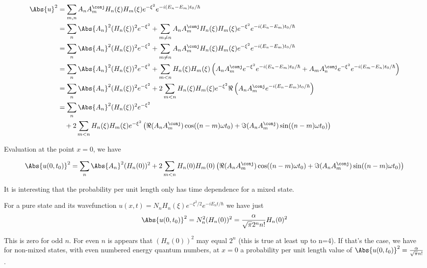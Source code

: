 \begin{align*}
\Abs{u}^2
&=
\sum_{m,n}
A_n A_m^\conj H_n(\xi) H_m(\xi) e^{-\xi^2} e^{-i (E_n - E_m)t_0/\hbar} \\
&=
\sum_n
\Abs{A_n}^2 (H_n(\xi))^2 e^{-\xi^2}
+\sum_{m \ne n}
A_n A_m^\conj H_n(\xi) H_m(\xi) e^{-\xi^2} e^{-i (E_n - E_m)t_0/\hbar} \\
&=
\sum_n
\Abs{A_n}^2 (H_n(\xi))^2 e^{-\xi^2}
+\sum_{m \ne n}
A_n A_m^\conj H_n(\xi) H_m(\xi) e^{-\xi^2} e^{-i (E_n - E_m)t_0/\hbar} \\
&=
\sum_n
\Abs{A_n}^2 (H_n(\xi))^2 e^{-\xi^2}
+\sum_{m < n}
H_n(\xi) H_m(\xi)
\left(
A_n A_m^\conj
e^{-\xi^2} e^{-i (E_n - E_m)t_0/\hbar}
+A_m A_n^\conj
e^{-\xi^2} e^{-i (E_m - E_n)t_0/\hbar}
\right) \\
&=
\sum_n
\Abs{A_n}^2 (H_n(\xi))^2 e^{-\xi^2}
+2 \sum_{m < n}
H_n(\xi) H_m(\xi)
e^{-\xi^2}
\Re \left(
A_n A_m^\conj
e^{-i (E_n - E_m)t_0/\hbar}
\right) \\
&=
\sum_n
\Abs{A_n}^2 (H_n(\xi))^2 e^{-\xi^2}  \\
&\quad+2 \sum_{m < n}
H_n(\xi) H_m(\xi)
e^{-\xi^2}
\left(
\Re ( A_n A_m^\conj ) \cos( (n - m)\omega t_0)
+\Im ( A_n A_m^\conj ) \sin( (n - m)\omega t_0)
\right) \\
\end{align*}

Evaluation at the point $x = 0$, we have

\begin{equation}\label{eqn:qmIproblemSet5:500}
\Abs{u(0,t_0)}^2
=
\sum_n
\Abs{A_n}^2 (H_n(0))^2 +2 \sum_{m < n} H_n(0) H_m(0) \left( \Re ( A_n A_m^\conj ) \cos( (n - m)\omega t_0) +\Im ( A_n A_m^\conj ) \sin( (n - m)\omega t_0)
\right)
\end{equation}

It is interesting that the probability per unit length only has time dependence for a mixed state.

For a pure state and its wavefunction $u(x,t) = N_n H_n(\xi) e^{-\xi^2/2} e^{-i E_n t/\hbar}$ we have just
\begin{equation}\label{eqn:qmIproblemSet5:510}
\Abs{u(0,t_0)}^2
=
N_n^2 (H_n(0))^2 = \frac{\alpha}{\sqrt{\pi} 2^n n!} H_n(0)^2
\end{equation}

This is zero for odd $n$.  For even $n$ is appears that $(H_n(0))^2$ may equal $2^n$ (this is true at least up to n=4).  If that's the case, we have for non-mixed states, with even numbered energy quantum numbers, at $x=0$ a probability per unit length value of $\Abs{u(0,t_0)}^2 = \frac{\alpha}{\sqrt{\pi} n!}$.

\EndNoBibArticle
